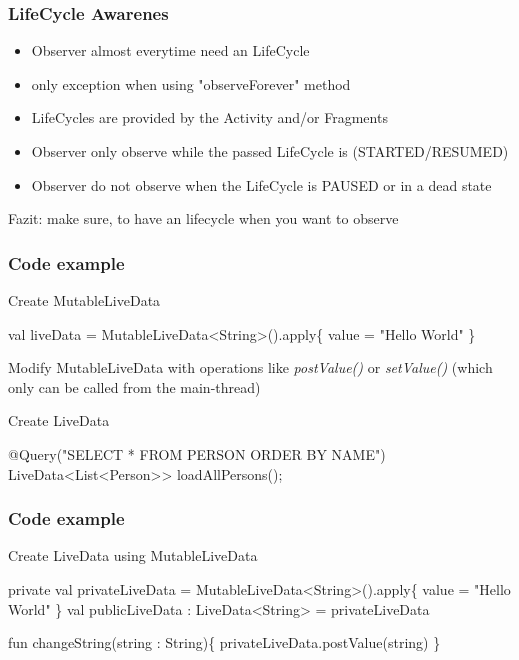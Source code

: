 \documentclass{beamer}
\begin{document}
	\begin{frame}
	\frametitle{LifeCycle Awarenes}
	\begin{itemize}
	\item Observer almost everytime need an LifeCycle
	\item only exception when using "observeForever" method
	\item LifeCycles are provided by the Activity and/or Fragments 
	\item Observer only observe while the passed LifeCycle is (STARTED/RESUMED)
	\item Observer do not observe when the LifeCycle is PAUSED or in a dead state
	\end{itemize}
	Fazit: make sure, to have an lifecycle when you want to observe
	\end{frame}	
	
	
	\begin{frame}[fragile]
	\frametitle{Code example}
		\begin{block}{Create MutableLiveData}
		\begin{semiverbatim}
			val liveData = MutableLiveData<String>().apply\{
			\quad value = "Hello World"
			\}
		\end{semiverbatim}
		Modify MutableLiveData with operations like \textit{postValue()} or \textit{setValue()} 		(which only can be called from the main-thread)
		\end{block}
		\begin{block}{Create LiveData}
		\begin{semiverbatim}
			@Query("SELECT * FROM PERSON ORDER BY NAME")
			LiveData<List<Person>> loadAllPersons();
		\end{semiverbatim}
	\end{block}
	\end{frame}
	
	\begin{frame}[fragile]
	\frametitle{Code example}
		\begin{block}{Create LiveData using MutableLiveData}
		\begin{semiverbatim}
			private val privateLiveData = MutableLiveData<String>()\linebreak.apply\{
			\quad value = "Hello World"
			\}
			val publicLiveData : LiveData<String> = privateLiveData
			
			fun changeString(string : String)\{
				\quad privateLiveData.postValue(string)
			\}
		\end{semiverbatim}
	\end{block}
	\end{frame}
	
\end{document}
